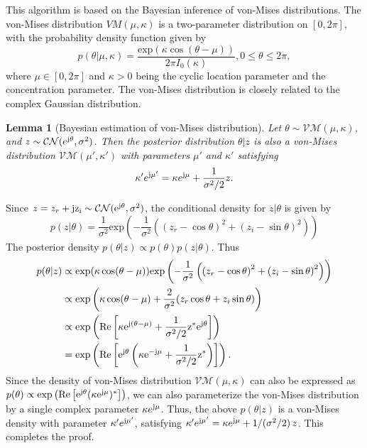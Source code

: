 \documentclass[12pt,draftclsnofoot,journal,onecolumn]{IEEEtran}
\newtheorem{lemma}{\bf Lemma}
\theoremstyle{nonumberplain}
\def \exp {\text{exp}}
\def \CN {\mathcal{CN}}
\def \VM {\mathcal{VM}}
\def \j  {\rm {j}}
\def \re {\rm Re}
\begin{document}
    This algorithm is based on the Bayesian inference of von-Mises distributions. The von-Mises distribution $VM(\mu, \kappa)$ is a two-parameter distribution on $[0, 2\pi]$, with the probability density function given by 
    \begin{equation}
        p(\theta|\mu, \kappa) = \frac{\exp(\kappa \cos(\theta - \mu))}{2\pi I_0(\kappa)}, 0\leq \theta \leq 2\pi,
    \end{equation}
    where $\mu \in [0,2\pi]$ and $\kappa >0$ being the cyclic location parameter and the concentration parameter. The von-Mises distribution is closely related to the complex Gaussian distribution.
    
    \begin{lemma}[Bayesian estimation of von-Mises distribution]\label{lemma_1}
        Let $\theta \sim \VM(\mu, \kappa)$, and $z \sim \CN(e^{\j\theta}, \sigma^2)$. Then the posterior distribution $\theta | z$ is also a von-Mises distribution $\VM(\mu', \kappa')$ with parameters $\mu'$ and $\kappa'$ satisfying
        \begin{equation}
            \kappa' e^{\j\mu'} = \kappa e^{\j\mu} + \frac{1}{\sigma^2/2}z.
        \end{equation}
    \end{lemma}
    \begin{IEEEproof}
        Since $z=z_r + \j z_i \sim \CN(e^{\j \theta}, \sigma^2)$, the conditional density for $z|\theta$ is given by 
        \begin{equation}
            p(z|\theta) = \frac{1}{\sigma^2}\exp\left(-\frac{1}{\sigma^2}\left(\left(z_r - \cos\theta\right)^2 + \left(z_i - \sin\theta\right)^2\right)\right)
        \end{equation}
        The posterior density $p(\theta | z) \propto p(\theta)p(z|\theta)$. Thus
        \begin{equation}
            \begin{aligned}
                p(\theta|z) & \propto \exp(\kappa \cos(\theta - \mu))\exp\left(-\frac{1}{\sigma^2}\left(\left(z_r - \cos\theta\right)^2 + \left(z_i - \sin\theta\right)^2\right)\right) \\
                & \propto \exp\left( \kappa \cos(\theta - \mu) + \frac{2}{\sigma^2}(z_r \cos\theta + z_i\sin\theta) \right) \\
                & \propto \exp\left( \re\left[ \kappa e^{\j (\theta - \mu)} + \frac{1}{\sigma^2/2}z^{*} e^{\j \theta} \right] \right) \\
                & = \exp\left( \re\left[ e^{\j \theta}\left(\kappa e^{-\j\mu} + \frac{1}{\sigma^2/2} z^*\right)\right] \right).
            \end{aligned}
        \end{equation}
        Since the density of von-Mises distribution $\VM(\mu, \kappa)$ can also be expressed as $p(\theta) \propto \exp\left( \re\left[ e^{\j \theta}(\kappa e^{\j \mu})^* \right] \right)$, we can also parameterize the von-Mises distribution by a single complex parameter $\kappa e^{\j\mu}$. Thus, the above $p(\theta|z)$ is a von-Mises density with parameter $\kappa'e^{\j\mu'}$, satisfying $\kappa' e^{\j\mu'} = \kappa e^{\j\mu} + 1/(\sigma^2/2)\,z$. This completes the proof.
    \end{IEEEproof}
\end{document}
